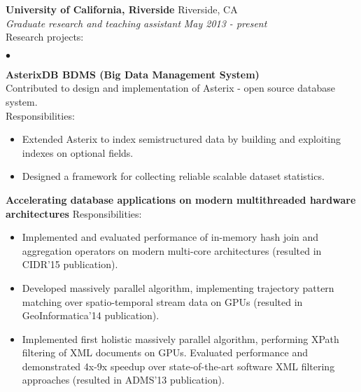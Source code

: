 \documentclass[margin,line]{res}
\newenvironment{list2}{
  \begin{list}{$\bullet$}{%
      \setlength{\itemsep}{0in}
      \setlength{\parsep}{0in} \setlength{\parskip}{0in}
      \setlength{\topsep}{0in} \setlength{\partopsep}{0in} 
      \setlength{\leftmargin}{0.2in}}}{\end{list}}
\begin{document}
\begin{resume}
{\bf University of California, Riverside } \hfill { Riverside, CA } \\
{\em Graduate research and teaching assistant } \hfill {\it May 2013 - present}\\
Research projects:\\
\begin{list2}
	\item {\bf AsterixDB BDMS (Big Data Management System)}\\
	Contributed to design and implementation of Asterix - open source database system.\\
	Responsibilities:
	\begin{itemize}[label=$\circ$]
		\item Extended Asterix to index semistructured data by building and exploiting indexes on optional fields.
		\item Designed a framework for collecting reliable scalable dataset statistics.
	\end{itemize}
	\item {\bf Accelerating database applications on modern multithreaded hardware architectures }
	Responsibilities:
	\begin{itemize}[label=$\circ$]
		\item Implemented and evaluated performance of in-memory hash join and aggregation operators on modern multi-core architectures (resulted in CIDR'15 publication).
		\item Developed massively parallel algorithm, implementing trajectory pattern matching over spatio-temporal stream data on GPUs (resulted in GeoInformatica'14 publication).
		\item Implemented first holistic massively parallel algorithm, performing XPath filtering of XML documents on GPUs. Evaluated performance and demonstrated 4x-9x speedup over state-of-the-art software XML filtering approaches (resulted in ADMS'13 publication).
	\end{itemize}
\end{list2}


\end{resume}
\end{document}
